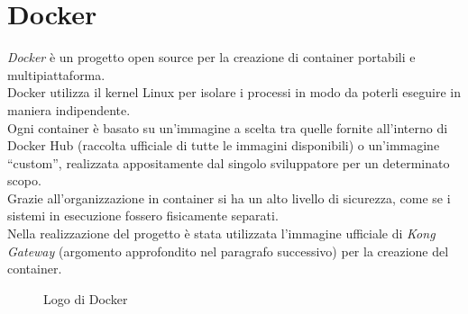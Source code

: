 \section{Docker}\label{sec:docker}
\emph{Docker} è un progetto open source per la creazione di container portabili e multipiattaforma.\\
Docker utilizza il kernel Linux per isolare i processi in modo da poterli eseguire in maniera indipendente.\\
Ogni container è basato su un'immagine a scelta tra quelle fornite all'interno di Docker Hub (raccolta ufficiale di tutte le immagini disponibili) o un'immagine “custom”, realizzata appositamente dal singolo sviluppatore per un determinato scopo.\\
Grazie all'organizzazione in container si ha un alto livello di sicurezza, come se i sistemi in esecuzione fossero fisicamente separati. \cite{RedHatDocker}\\
Nella realizzazione del progetto è stata utilizzata l'immagine ufficiale di \emph{Kong Gateway} (argomento approfondito nel paragrafo successivo) per la creazione del container.
\begin{figure}[ht]
	\centering
	\caption{Logo di Docker}
	\label{fig:one}
\end{figure}

